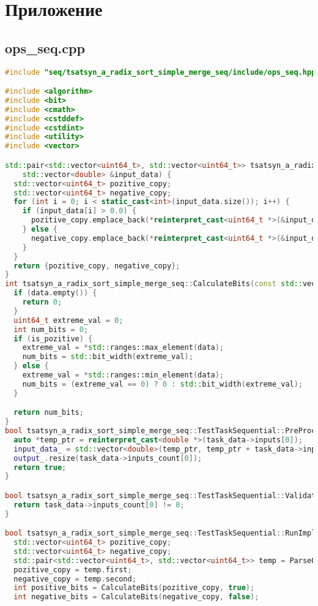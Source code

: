 \documentclass[a4paper,12pt]{article}
\begin{document}
\section{Приложение}
\subsection{ops\_seq.cpp}
\begin{lstlisting}[language=C++,
    breaklines=true,       % Автоматический перенос строк
    columns=fullflexible ]
#include "seq/tsatsyn_a_radix_sort_simple_merge_seq/include/ops_seq.hpp"

#include <algorithm>
#include <bit>
#include <cmath>
#include <cstddef>
#include <cstdint>
#include <utility>
#include <vector>

std::pair<std::vector<uint64_t>, std::vector<uint64_t>> tsatsyn_a_radix_sort_simple_merge_seq::ParseOrigin(
    std::vector<double> &input_data) {
  std::vector<uint64_t> pozitive_copy;
  std::vector<uint64_t> negative_copy;
  for (int i = 0; i < static_cast<int>(input_data.size()); i++) {
    if (input_data[i] > 0.0) {
      pozitive_copy.emplace_back(*reinterpret_cast<uint64_t *>(&input_data[i]));
    } else {
      negative_copy.emplace_back(*reinterpret_cast<uint64_t *>(&input_data[i]));
    }
  }
  return {pozitive_copy, negative_copy};
}
int tsatsyn_a_radix_sort_simple_merge_seq::CalculateBits(const std::vector<uint64_t> &data, bool is_pozitive) {
  if (data.empty()) {
    return 0;
  }
  uint64_t extreme_val = 0;
  int num_bits = 0;
  if (is_pozitive) {
    extreme_val = *std::ranges::max_element(data);
    num_bits = std::bit_width(extreme_val);
  } else {
    extreme_val = *std::ranges::min_element(data);
    num_bits = (extreme_val == 0) ? 0 : std::bit_width(extreme_val);
  }

  return num_bits;
}
bool tsatsyn_a_radix_sort_simple_merge_seq::TestTaskSequential::PreProcessingImpl() {
  auto *temp_ptr = reinterpret_cast<double *>(task_data->inputs[0]);
  input_data_ = std::vector<double>(temp_ptr, temp_ptr + task_data->inputs_count[0]);
  output_.resize(task_data->inputs_count[0]);
  return true;
}

bool tsatsyn_a_radix_sort_simple_merge_seq::TestTaskSequential::ValidationImpl() {
  return task_data->inputs_count[0] != 0;
}

bool tsatsyn_a_radix_sort_simple_merge_seq::TestTaskSequential::RunImpl() {
  std::vector<uint64_t> pozitive_copy;
  std::vector<uint64_t> negative_copy;
  std::pair<std::vector<uint64_t>, std::vector<uint64_t>> temp = ParseOrigin(input_data_);
  pozitive_copy = temp.first;
  negative_copy = temp.second;
  int positive_bits = CalculateBits(pozitive_copy, true);
  int negative_bits = CalculateBits(negative_copy, false);


\end{lstlisting}
\end{document}
